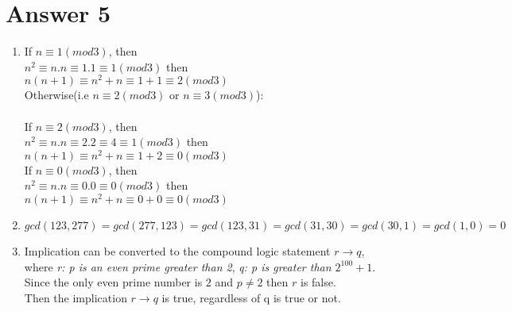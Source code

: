 \documentclass[12pt]{article}
\begin{document}
\section*{Answer 5}

\begin{enumerate}[label=(\alph*)]

\item

	If $n\equiv 1(mod 3)$, then\\
	$n^2\equiv n.n\equiv 1.1\equiv 1(mod 3)$ then\\
	$n(n+1)\equiv n^2+n\equiv 1+1\equiv 2(mod 3)$\\

	Otherwise(i.e $n\equiv 2(mod 3)$ or $n\equiv 3(mod 3)$):\\\\
	If $n\equiv 2(mod 3)$, then\\
	$n^2\equiv n.n\equiv 2.2\equiv 4\equiv 1(mod 3)$ then\\
	$n(n+1)\equiv n^2+n\equiv 1+2\equiv 0(mod 3)$\\

	If $n\equiv 0(mod 3)$, then\\
	$n^2\equiv n.n\equiv 0.0\equiv 0(mod 3)$ then\\
	$n(n+1)\equiv n^2+n\equiv 0+0\equiv 0(mod 3)$

\item

	$gcd(123,277)=gcd(277,123)=gcd(123,31)=gcd(31,30)=gcd(30,1)=gcd(1,0)=0$

\item

	Implication can be converted to the compound logic statement  $r\rightarrow q$,\\
where \textit{r: p is an even prime greater than 2}, \textit{q: p is greater than $2^{100}+1$}.\\

	Since the only even prime number is $2$ and $p\neq 2$ then $r$ is false.\\
	Then the implication $r\rightarrow q$ is true, regardless of q is true or not.

\end{enumerate}
\end{document}
